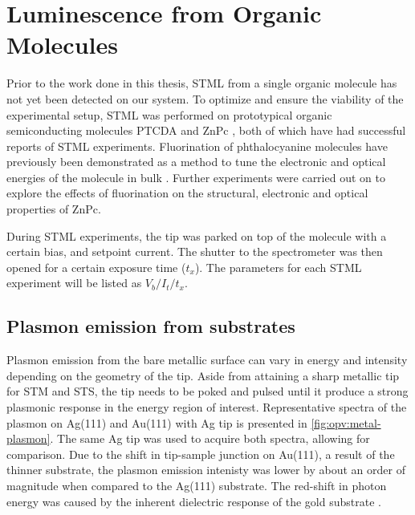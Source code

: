 
\chapter{Luminescence from Organic Molecules}
\label{ch:opv}

Prior to the work done in this thesis, \ac{STML} from a single organic molecule has not yet been detected on our system. To optimize and ensure the viability of the experimental setup, \ac{STML} was performed on prototypical organic semiconducting molecules \ac{PTCDA} \citep{Rzeznicka2011, Kimura2019} and \ac{ZnPc} \citep{Zhang2016, Doppagne2017, Zhang2017, Imada2016, Doppagne2018, Miwa2019}, both of which have had successful reports of \ac{STML} experiments. Fluorination of phthalocyanine molecules have previously been demonstrated as a method to tune the electronic and optical energies of the molecule in bulk \citep{schwarze2016band, warren2019controlling}. Further experiments were carried out on  to explore the effects of fluorination on the structural, electronic and optical properties of ZnPc.

During \ac{STML} experiments, the tip was parked on top of the molecule with a certain bias, and setpoint current. The shutter to the spectrometer was then opened for a certain exposure time ($t_x$). The parameters for each \ac{STML} experiment will be listed as $V_b/I_t/t_x$.

\section{Plasmon emission from substrates}

Plasmon emission from the bare metallic surface can vary in energy and intensity depending on the geometry of the tip. Aside from attaining a sharp metallic tip for \ac{STM} and \ac{STS}, the tip needs to be poked and pulsed until it produce a strong plasmonic response in the energy region of interest. Representative spectra of the plasmon on Ag(111) and Au(111) with Ag tip is presented in \autoref{fig:opv:metal-plasmon}. The same Ag tip was used to acquire both spectra, allowing for comparison. Due to the shift in tip-sample junction on Au(111), a result of the thinner substrate, the plasmon emission intenisty was lower by about an order of magnitude when compared to the Ag(111) substrate. The red-shift in photon energy was caused by the inherent dielectric response of the gold substrate \citep{olmon2012optical, yang2015optical}. 

